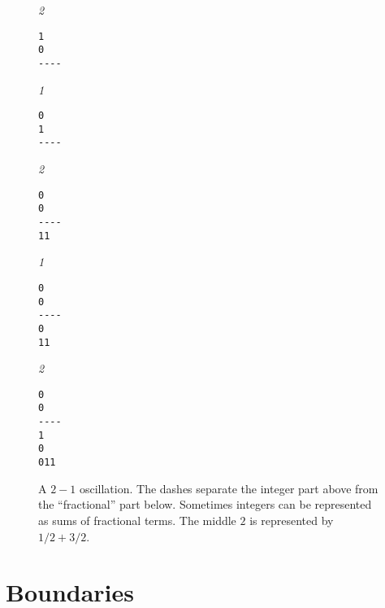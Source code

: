 \documentclass{article}
\begin{document}
\begin{figure}
  \begin{multicols}{5}
\emph{2}
\begin{verbatim}
1
0
----
\end{verbatim}
\columnbreak
\emph{1}
\begin{verbatim}
0
1
----
\end{verbatim}
\columnbreak
\emph{2}
\begin{verbatim}
0
0
----
11
\end{verbatim}
\columnbreak
\emph{1}
\begin{verbatim}
0
0
----
0
11
\end{verbatim}
\columnbreak
\emph{2}
\begin{verbatim}
0
0
----
1
0
011
\end{verbatim}
\columnbreak
  \end{multicols}
  \caption{A $2-1$ oscillation. The dashes separate the integer part above
    from the ``fractional'' part below. Sometimes integers can be represented
  as sums of fractional terms. The middle $2$ is represented by $1/2 + 3/2$.}
\end{figure}

\section{Boundaries}





\end{document}

